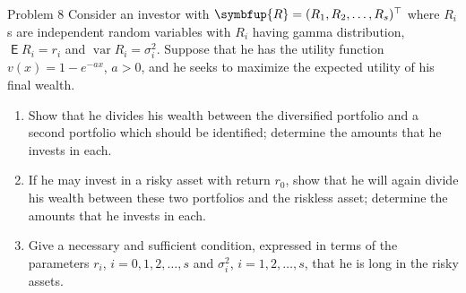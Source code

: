\documentclass[10pt,handout]{beamer}
\newcommand{\vR}{\symbfup{R}}
\DeclareMathOperator\expc{\mathsf{E}}
\DeclareMathOperator\var{var}
\theoremstyle{definition}
\begin{document}
\begin{frame}{Problem 8}
  Consider an investor with $\vR = (R_1, R_2, \ldots, R_s)^\top$ where $R_i$s are independent random variables with $R_i$ having gamma distribution, $\expc{R_i} = r_i$ and $\var R_i = \sigma_i^2$. Suppose that he has the utility function $v(x) = 1 - e^{-ax}$, $a > 0$, and he seeks to maximize the expected utility of his final wealth. 
  \begin{enumerate}
    \item Show that he divides his wealth between the diversified portfolio and a second portfolio which should be identified; determine the amounts that he invests in each. 
    \item If he may invest in a risky asset with return $r_0$, show that he will again divide his wealth between these two portfolios and the riskless asset; determine the amounts that he invests in each. 
    \item Give a necessary and sufficient condition, expressed in terms of the parameters $r_i$, $i = 0, 1, 2, \ldots, s$ and $\sigma_i^2$, $i = 1, 2, \ldots, s$, that he is long in the risky assets.
  \end{enumerate}
\end{frame}
\end{document}
